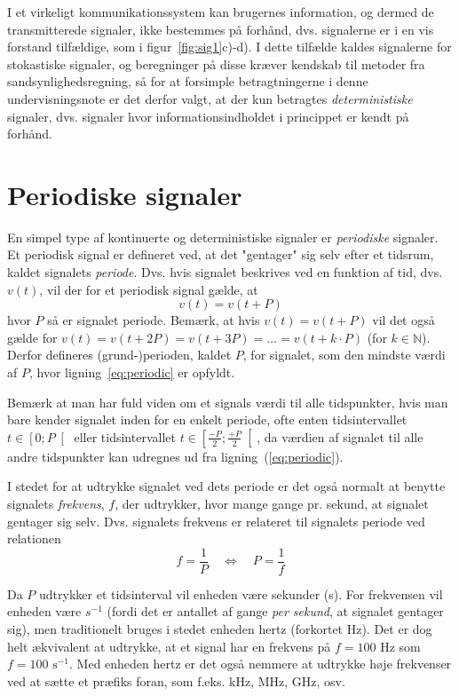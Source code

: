 \documentclass[11pt,a4paper]{article}
\begin{document}
I et virkeligt kommunikationssystem kan brugernes information, og dermed de transmitterede signaler, ikke bestemmes på forhånd, dvs. signalerne er i en vis forstand tilfældige, som i figur~\ref{fig:sig1}c)-d). I dette tilfælde kaldes signalerne for stokastiske signaler, og beregninger på disse kræver kendskab til metoder fra sandsynlighedsregning, så for at forsimple betragtningerne i denne undervisningsnote er det derfor valgt, at der kun betragtes \emph{deterministiske} signaler, dvs. signaler hvor informationsindholdet i princippet er kendt på forhånd. 

\section{Periodiske signaler}
En simpel type af kontinuerte og deterministiske signaler er \emph{periodiske} signaler. Et periodisk signal er defineret ved, at det "gentager" sig selv efter et tidsrum, kaldet signalets \emph{periode}. Dvs. hvis signalet beskrives ved en funktion af tid, dvs. $v(t)$, vil der for et periodisk signal gælde, at
\begin{equation}\label{eq:periodic}
v(t) = v(t + P)
\end{equation}
hvor $P$ så er signalet periode. Bemærk, at hvis $v(t) = v(t+P)$ vil det også gælde for $v(t)=v(t+2P)=v(t+3P)=\ldots=v(t+k\cdot{}P)$ (for $k\in{}\mathbb{N}$). Derfor defineres (grund-)perioden, kaldet $P$, for signalet, som den mindste værdi af $P$, hvor ligning~\ref{eq:periodic} er opfyldt.

Bemærk at man har fuld viden om et signals værdi til alle tidspunkter, hvis man bare kender signalet inden for en enkelt periode, ofte enten tidsintervallet $t\in\left[0;P\right[$ eller tidsintervallet $t\in\left[\frac{-P}{2};\frac{+P}{2}\right[$, da værdien af signalet til alle andre tidspunkter kan udregnes ud fra ligning~(\ref{eq:periodic}).

I stedet for at udtrykke signalet ved dets periode er det også normalt at benytte signalets \emph{frekvens}, $f$, der udtrykker, hvor mange gange pr. sekund, at signalet gentager sig selv. Dvs. signalets frekvens er relateret til signalets periode ved relationen         
\begin{equation}
f=\frac{1}{P}\quad\Leftrightarrow\quad{}P=\frac{1}{f}
\end{equation}

\noindent{}Da $P$ udtrykker et tidsinterval vil enheden være sekunder (s). For frekvensen vil enheden være $s^{-1}$ (fordi det er antallet af gange \emph{per sekund}, at signalet gentager sig), men traditionelt bruges i stedet enheden hertz (forkortet Hz). Det er dog helt ækvivalent at udtrykke, at et signal har en frekvens på $f=100\textrm{ Hz}$ som $f=100\textrm{ s}^{-1}$. Med enheden hertz er det også nemmere at udtrykke høje frekvenser ved at sætte et præfiks foran, som f.eks. kHz, MHz, GHz, osv.
\end{document}
